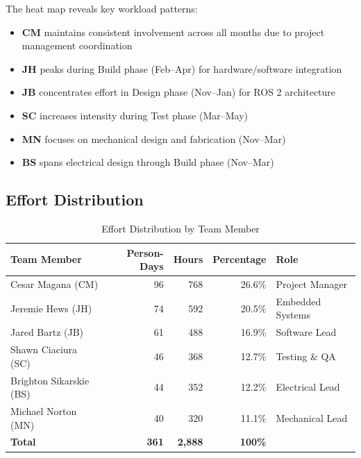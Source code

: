 \begin{center}
\end{center}

The heat map reveals key workload patterns:
\begin{itemize}
    \item \textbf{CM} maintains consistent involvement across all months due to project management coordination
    \item \textbf{JH} peaks during Build phase (Feb--Apr) for hardware/software integration
    \item \textbf{JB} concentrates effort in Design phase (Nov--Jan) for ROS 2 architecture
    \item \textbf{SC} increases intensity during Test phase (Mar--May)
    \item \textbf{MN} focuses on mechanical design and fabrication (Nov--Mar)
    \item \textbf{BS} spans electrical design through Build phase (Nov--Mar)
\end{itemize}

\subsection{Effort Distribution}

\begin{table}[H]
\centering
\caption{Effort Distribution by Team Member}
\label{tab:effort}
\begin{tabular}{@{}lrrrl@{}}
\toprule
\textbf{Team Member} & \textbf{Person-Days} & \textbf{Hours} & \textbf{Percentage} & \textbf{Role} \\
\midrule
Cesar Magana (CM) & 96 & 768 & 26.6\% & Project Manager \\
Jeremie Hews (JH) & 74 & 592 & 20.5\% & Embedded Systems \\
Jared Bartz (JB) & 61 & 488 & 16.9\% & Software Lead \\
Shawn Ciaciura (SC) & 46 & 368 & 12.7\% & Testing \& QA \\
Brighton Sikarskie (BS) & 44 & 352 & 12.2\% & Electrical Lead \\
Michael Norton (MN) & 40 & 320 & 11.1\% & Mechanical Lead \\
\midrule
\textbf{Total} & \textbf{361} & \textbf{2,888} & \textbf{100\%} & \\
\bottomrule
\end{tabular}
\end{table}

